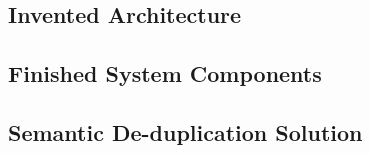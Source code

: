 \subsection{Invented Architecture}
\label{sec:architecture}


\subsection{Finished System Components}


\subsection{Semantic De-duplication Solution}

